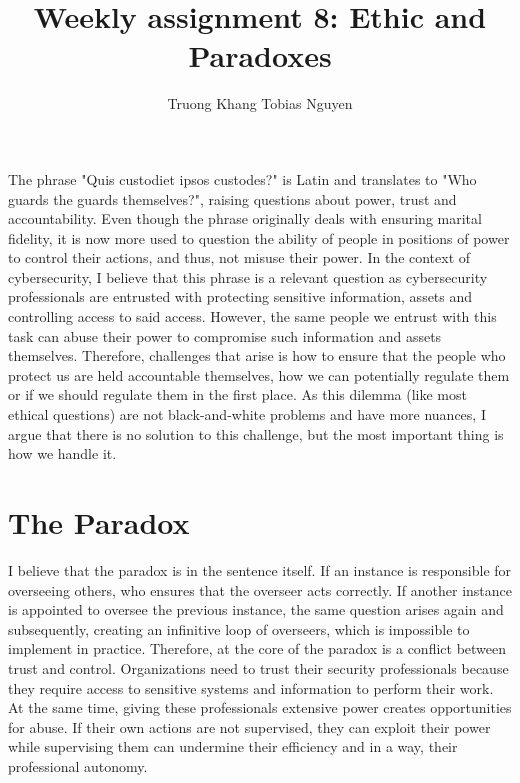 \documentclass[12pt]{article}
\title{Weekly assignment 8: Ethic and Paradoxes}
\author{Truong Khang Tobias Nguyen}
\date{}
\begin{document}
\maketitle

The phrase "Quis custodiet ipsos custodes?" is Latin and translates to "Who guards the guards themselves?", raising questions about power, trust and accountability. Even though the phrase originally deals with ensuring marital fidelity, it is now more used to question the ability of people in positions of power to control their actions, and thus, not misuse their power.
\newline
In the context of cybersecurity, I believe that this phrase is a relevant question as cybersecurity professionals are entrusted with protecting sensitive information, assets and controlling access to said access. However, the same people we entrust with this task can abuse their power to compromise such information and assets themselves.
\newline
Therefore, challenges that arise is how to ensure that the people who protect us are held accountable themselves, how we can potentially regulate them or if we should regulate them in the first place.
\newline
As this dilemma (like most ethical questions) are not black-and-white problems and have more nuances, I argue that there is no solution to this challenge, but the most important thing is how we handle it.

\section{The Paradox}
I believe that the paradox is in the sentence itself. If an instance is responsible for overseeing others, who ensures that the overseer acts correctly. If another instance is appointed to oversee the previous instance, the same question arises again and subsequently, creating an infinitive loop of overseers, which is impossible to implement in practice.
\newline
Therefore, at the core of the paradox is a conflict between trust and control. Organizations need to trust their security professionals because they require access to sensitive systems and information to perform their work. At the same time, giving these professionals extensive power creates opportunities for abuse. If their own actions are not supervised, they can exploit their power while supervising them can undermine their efficiency and in a way, their professional autonomy. 
\end{document}
